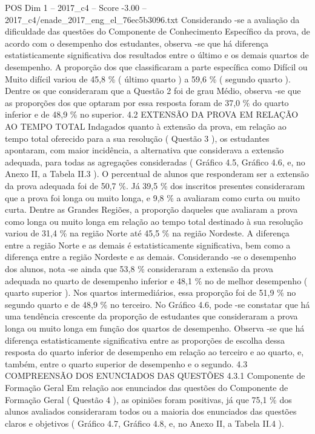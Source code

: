 \begin{textsample}{POS Dim 1 – 2017\_c4 – Score -3.00 – 2017\_c4/enade\_2017\_eng\_el\_76ec5b3096.txt}
Considerando -se a avaliação da dificuldade das questões do Componente de Conhecimento Específico da prova, de acordo com o desempenho dos estudantes, observa -se que há diferença estatisticamente significativa dos resultados entre o último e os demais quartos de desempenho.
A proporção dos que classificaram a parte específica como Difícil ou Muito difícil variou de 45,8 \% ( último quarto ) a 59,6 \% ( segundo quarto ).
Dentre os que consideraram que a Questão 2 foi de grau Médio, observa -se que as proporções dos que optaram por essa resposta foram de 37,0 \% do quarto inferior e de 48,9 \% no superior. 4.2 EXTENSÃO DA PROVA EM RELAÇÃO AO TEMPO TOTAL Indagados quanto à extensão da prova, em relação ao tempo total oferecido para a sua resolução ( Questão 3 ), os estudantes apontaram, com maior incidência, a alternativa que considerava a extensão adequada, para todas as agregações consideradas ( Gráfico 4.5, Gráfico 4.6, e, no Anexo II, a Tabela II.3 ).
O percentual de alunos que responderam ser a extensão da prova adequada foi de 50,7 \%.
Já 39,5 \% dos inscritos presentes consideraram que a prova foi longa ou muito longa, e 9,8 \% a avaliaram como curta ou muito curta.
Dentre as Grandes Regiões, a proporção daqueles que avaliaram a prova como longa ou muito longa em relação ao tempo total destinado à sua resolução variou de 31,4 \% na região Norte até 45,5 \% na região Nordeste.
A diferença entre a região Norte e as demais é estatisticamente significativa, bem como a diferença entre a região Nordeste e as demais.
Considerando -se o desempenho dos alunos, nota -se ainda que 53,8 \% consideraram a extensão da prova adequada no quarto de desempenho inferior e 48,1 \% no de melhor desempenho ( quarto superior ).
Nos quartos intermediários, essa proporção foi de 51,9 \% no segundo quarto e de 48,9 \% no terceiro.
No Gráfico 4.6, pode -se constatar que há uma tendência crescente da proporção de estudantes que consideraram a prova longa ou muito longa em função dos quartos de desempenho.
Observa -se que há diferença estatisticamente significativa entre as proporções de escolha dessa resposta do quarto inferior de desempenho em relação ao terceiro e ao quarto, e, também, entre o quarto superior de desempenho e o segundo. 4.3 COMPREENSÃO DOS ENUNCIADOS DAS QUESTÕES 4.3.1 Componente de Formação Geral Em relação aos enunciados das questões do Componente de Formação Geral ( Questão 4 ), as opiniões foram positivas, já que 75,1 \% dos alunos avaliados consideraram todos ou a maioria dos enunciados das questões claros e objetivos ( Gráfico 4.7, Gráfico 4.8, e, no Anexo II, a Tabela II.4 ).

\end{textsample}
